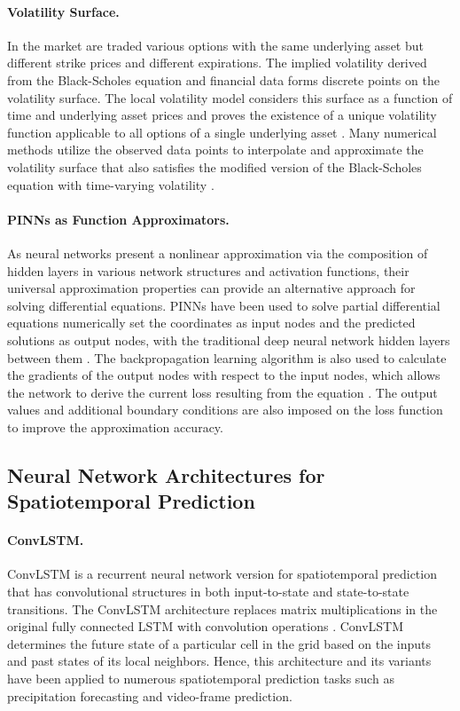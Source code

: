 \documentclass{article}
\begin{document}
\paragraph{Volatility Surface.}
In the market are traded various options with the same underlying asset but different strike prices and different expirations. 
The implied volatility derived from the Black-Scholes equation and financial data forms discrete points on the volatility surface. 
The local volatility model considers this surface as a function of time and underlying asset prices and proves the existence of a unique volatility function applicable to all options of a single underlying asset \citep{derman1994riding, dupire1994pricing}. 
Many numerical methods utilize the observed data points to interpolate and approximate the volatility surface that also satisfies the modified version of the Black-Scholes equation with time-varying volatility \citep{anwar2018astudy, guo2018local, jin2018reconstruction, cen2011arobust}. 
\paragraph{PINNs as Function Approximators.}
As neural networks present a nonlinear approximation via the composition of hidden layers in various network structures and activation functions, their universal approximation properties can provide an alternative approach for solving differential equations.
PINNs have been used to solve partial differential equations numerically set the coordinates as input nodes and the predicted solutions as output nodes, with the traditional deep neural network hidden layers between them \citep{raissi2019physics}. 
The backpropagation learning algorithm is also used to calculate the gradients of the output nodes with respect to the input nodes, which allows the network to derive the current loss resulting from the equation
\citep{raissi2019physics, lagaris1998artificial}. 
The output values and additional boundary conditions are also imposed on the loss function to improve the approximation accuracy.

\subsection{Neural Network Architectures for Spatiotemporal Prediction}
\paragraph{ConvLSTM.}
ConvLSTM is a recurrent neural network version for spatiotemporal prediction that has convolutional structures in both input-to-state and state-to-state transitions.
The ConvLSTM architecture replaces matrix multiplications in the original fully connected LSTM with convolution operations \citep{shi2015convolutional}. 
ConvLSTM determines the future state of a particular cell in the grid based on the inputs and past states of its local neighbors.
Hence, this architecture and its variants have been applied to numerous spatiotemporal prediction tasks such as precipitation forecasting and video-frame prediction.
\end{document}
